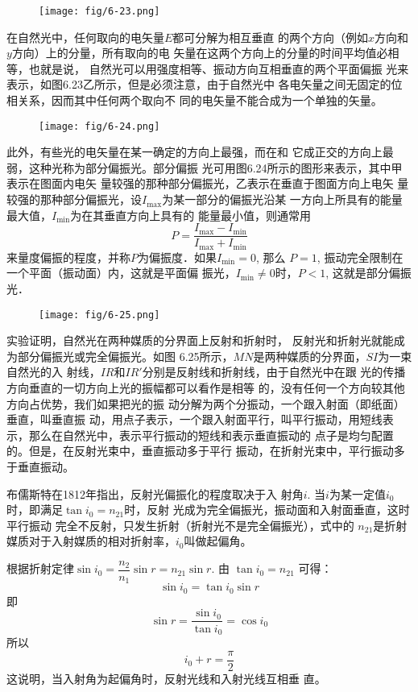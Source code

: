 \begin{figure}[htp]
    \centering
     \texttt{[image: fig/6-23.png]}
    \caption{}
\end{figure}

在自然光中，任何取向的电矢量$E$都可分解为相互垂直
的两个方向（例如$x$方向和$y$方向）上的分量，所有取向的电
矢量在这两个方向上的分量的时间平均值必相等，也就是说，
自然光可以用强度相等、振动方向互相垂直的两个平面偏振
光来表示，如图6.23乙所示，但是必须注意，由于自然光中
各电矢量之间无固定的位相关系，因而其中任何两个取向不
同的电矢量不能合成为一个单独的矢量。


\begin{figure}[htp]
    \centering
     \texttt{[image: fig/6-24.png]}
    \caption{}
\end{figure}

此外，有些光的电矢量在某一确定的方向上最强，而在和
它成正交的方向上最弱，这种光称为部分偏振光。部分偏振
光可用图6.24所示的图形来表示，其中甲表示在图面内电矢
量较强的那种部分偏振光，乙表示在垂直于图面方向上电矢
量较强的那种部分偏振光，设$I_{\max}$为某一部分的偏振光沿某
一方向上所具有的能量最大值，$I_{\min}$为在其垂直方向上具有的
能量最小值，则通常用
\[P=\frac{I_{\max}-I_{\min}}{I_{\max}+I_{\min}}\]
来量度偏振的程度，并称$P$为偏振度．如果$I_{\min}=0$, 那么
$P=1$, 振动完全限制在一个平面（振动面）内，这就是平面偏
振光，$I_{\min}\ne 0$时，$P<1$, 这就是部分偏振光．

\begin{figure}[htp]
    \centering
     \texttt{[image: fig/6-25.png]}
    \caption{}
\end{figure}

实验证明，自然光在两种媒质的分界面上反射和折射时，
反射光和折射光就能成为部分偏振光或完全偏振光。如图
6.25所示，$MN$是两种媒质的分界面，$SI$为一束自然光的入
射线，$IR$和$IR'$分别是反射线和折射线，由于自然光中在跟
光的传播方向垂直的一切方向上光的振幅都可以看作是相等
的，没有任何一个方向较其他方向占优势，我们如果把光的振
动分解为两个分振动，一个跟入射面（即纸面）垂直，叫垂直振
动，用点子表示，一个跟入射面平行，叫平行振动，用短线表
示，那么在自然光中，表示平行振动的短线和表示垂直振动的
点子是均匀配置的。但是，在反射光束中，垂直振动多于平行
振动，在折射光束中，平行振动多于垂直振动。

布儒斯特在1812年指出，反射光偏振化的程度取决于入
射角$i$. 当$i$为某一定值$i_0$时，即满足$\tan i_0=n_{21}$时，反射
光成为完全偏振光，振动面和入射面垂直，这时平行振动
完全不反射，只发生折射（折射光不是完全偏振光），式中的
$n_{21}$是折射媒质对于入射媒质的相对折射率，$i_0$叫做起偏角。

根据折射定律$\sin i_0=\dfrac{n_2}{n_1}\sin r=n_{21}\sin r$. 由
$\tan i_0=n_{21}$
可得：
\[\sin i_0=\tan i_0\sin r\]
即
\[\sin r=\frac{\sin i_0}{\tan i_0}=\cos i_0\]
所以
\[i_0+r=\frac{\pi}{2}\]
这说明，当入射角为起偏角时，反射光线和入射光线互相垂
直。

